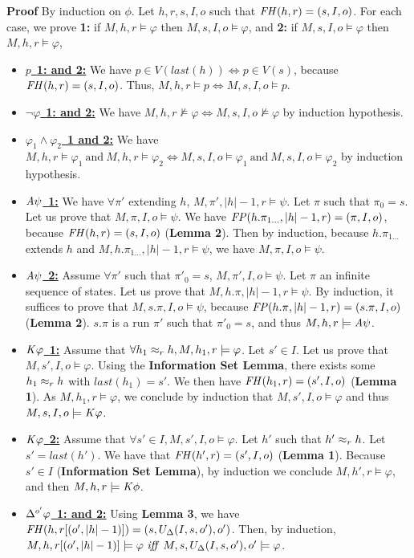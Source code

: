 \textbf{Proof} By induction on $\phi$.
Let $h,r,s,I,o$ such that $\mathit{FH}(h,r)=(s,I,o)$.
For each case, we prove \textbf{1:} if $M,h,r\models\varphi$ then $M,s,I,o\models\varphi$,
and \textbf{2:} if $M,s,I,o\models\varphi$ then $M,h,r\models\varphi$,
\begin{itemize}
\item\underline{$p$~\textbf{1: and 2:}} We have $p\in V(\mathit{last}(h))\iff p\in V(s)$, because $\mathit{FH}(h,r)=(s,I,o)$. Thus, $M,h,r\models p\iff M,s,I,o\models p$.
\item\underline{$\neg\varphi$~\textbf{1: and 2:}} We have $M,h,r\not\models\varphi\iff M,s,I,o\not\models\varphi$ by induction hypothesis.
\item\underline{$\varphi_1\wedge\varphi_2$~\textbf{1 and 2:}} We have $M,h,r\models\varphi_1~\text{and}~M,h,r\models\varphi_2\iff M,s,I,o\models\varphi_1~\text{and}~M,s,I,o\models\varphi_2$ by induction hypothesis.
\item\underline{$\mathit{A}\psi$~\textbf{1:}} We have $\forall\pi'$ extending $h$, $M,\pi',|h|-1,r\models\psi$. Let $\pi$ such that $\pi_0=s$. Let us prove that $M,\pi,I,o\models\psi$.
We have $\mathit{FP}(h.\pi_{1\dots},|h|-1,r)=(\pi,I,o)$, because $\mathit{FH}(h,r)=(s,I,o)$ (\textbf{Lemma 2}). Then by induction, because $h.\pi_{1\dots}$ extends $h$ and $ M,h.\pi_{1\dots},|h|-1,r\models\psi$, we have $M,\pi,I,o\models\psi$.
\item\underline{$\mathit{A}\psi$~\textbf{2:}} Assume $\forall\pi'$ such that $\pi'_0=s$, $M,\pi',I,o\models\psi$. Let $\pi$ an infinite sequence of states. Let us prove that $M,h.\pi,|h|-1,r\models\psi$. By induction, it suffices to prove that $M,s.\pi,I,o\models\psi$, because $\mathit{FP}(h.\pi,|h|-1,r)=(s.\pi,I,o)$ (\textbf{Lemma 2}). $s.\pi$ is a run $\pi'$ such that $\pi'_0=s$, and thus $M,h,r\models\mathit{A}\psi$.
\item\underline{$\mathit{K}\varphi$~\textbf{1:}} Assume that $\forall h_1\approx_{r}h, M,h_1,r\models\varphi$. Let $s'\in I$. Let us prove that $M,s',I,o\models\varphi$. Using the \textbf{Information Set Lemma}, there exists some $h_1\approx_{r}h$ with $\mathit{last}(h_1)=s'$. We then have $\mathit{FH}(h_1,r)=(s',I,o)$ (\textbf{Lemma 1}). As $M,h_1,r\models\varphi$, we conclude by induction that $M,s',I,o\models\varphi$ and thus $M,s,I,o\models\mathit{K}\varphi$.
\item\underline{$\mathit{K}\varphi$~\textbf{2:}} Assume that $\forall s'\in I, M,s',I,o\models\varphi$. Let $h'$ such that $h'\approx_{r}h$. Let $s'=\mathit{last}(h')$. We have that $\mathit{FH}(h',r)=(s',I,o)$ (\textbf{Lemma 1}). Because $s'\in I$ (\textbf{Information Set Lemma}), by induction we conclude $M,h',r\models\varphi$, and then $M,h,r\models\mathit{K}\phi$.
\item\underline{$\Delta^{o'}\varphi$~\textbf{1: and 2:}} Using \textbf{Lemma 3}, we have $\mathit{FH}(h,r[(o',|h|-1)])=(s,U_{\Delta}(I,s,o'),o')$.
Then, by induction, $M,h,r[(o',|h|-1)]\models\varphi\ \mathit{iff}\  M,s,U_{\Delta}(I,s,o'),o'\models\varphi$.
\end{itemize}
